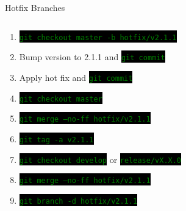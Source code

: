 \documentclass[
14pt,
aspectratio=169,
usenames,
dvipsnames,
x11names]{beamer}
\newcommand{\code}[1]{{\small\setlength{\fboxsep}{2pt}\colorbox{black}{\textcolor{green}{\texttt{#1}}}}}
\newcommand{\shadowbox}[2]{%
  \hbox{%
    \begin{tcolorbox}[beamer,
      width=#1,
      drop fuzzy shadow=black,
      arc=0pt,
      boxsep=0pt,
      left=0pt,right=0pt,top=0pt,bottom=0pt,
      ]%
      #2
    \end{tcolorbox}
  }
}
\begin{document}
\begin{frame}{Hotfix Branches}
  \begin{columns}
    \pause
    \begin{column}{.65\linewidth}
      \minipage[c][0.75\textheight][s]{\columnwidth}
      \begin{enumerate}[<+->] \setlength{\itemsep}{\fill}
      \item \code{git checkout master -b hotfix/v2.1.1}
      \item Bump version to 2.1.1 and \code{git commit}
      \item Apply hot fix and \code{git commit}
      \item \code{git checkout master}
      \item \code{git merge --no-ff hotfix/v2.1.1}
      \item \code{git tag -a v2.1.1}
      \item \code{git checkout develop} or \code{release/vX.X.0}
      \item \code{git merge --no-ff hotfix/v2.1.1}
      \item \code{git branch -d hotfix/v2.1.1}
      \end{enumerate}
      \endminipage
    \end{column}
  \end{columns}
\end{frame}
\end{document}
